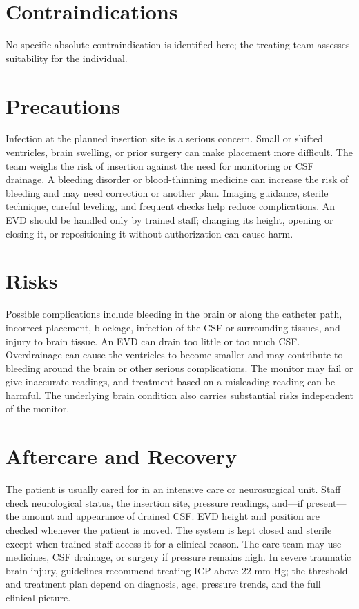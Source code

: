 \section*{Contraindications}
No specific absolute contraindication is identified here; the treating team assesses suitability for the individual.

\section*{Precautions}
Infection at the planned insertion site is a serious concern. Small or shifted ventricles, brain swelling, or prior surgery can make placement more difficult. The team weighs the risk of insertion against the need for monitoring or CSF drainage. A bleeding disorder or blood-thinning medicine can increase the risk of bleeding and may need correction or another plan. Imaging guidance, sterile technique, careful leveling, and frequent checks help reduce complications. An EVD should be handled only by trained staff; changing its height, opening or closing it, or repositioning it without authorization can cause harm.

\section*{Risks}
Possible complications include bleeding in the brain or along the catheter path, incorrect placement, blockage, infection of the CSF or surrounding tissues, and injury to brain tissue. An EVD can drain too little or too much CSF. Overdrainage can cause the ventricles to become smaller and may contribute to bleeding around the brain or other serious complications. The monitor may fail or give inaccurate readings, and treatment based on a misleading reading can be harmful. The underlying brain condition also carries substantial risks independent of the monitor.

\section*{Aftercare and Recovery}
The patient is usually cared for in an intensive care or neurosurgical unit. Staff check neurological status, the insertion site, pressure readings, and—if present—the amount and appearance of drained CSF. EVD height and position are checked whenever the patient is moved. The system is kept closed and sterile except when trained staff access it for a clinical reason. The care team may use medicines, CSF drainage, or surgery if pressure remains high. In severe traumatic brain injury, guidelines recommend treating ICP above 22 mm Hg; the threshold and treatment plan depend on diagnosis, age, pressure trends, and the full clinical picture.

